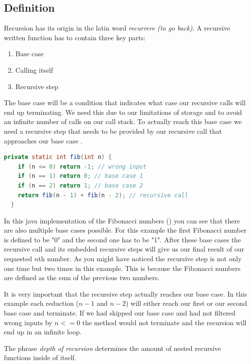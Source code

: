 \documentclass[a4paper, 11pt]{article}
\begin{document}
\subsection{Definition}
Recursion has its origin in the latin word \textit{recurrere (to go back)}. A recursive written function has to contain three key parts:

\begin{enumerate}
  \item Base case
  \item Calling itself
  \item Recursive step
\end{enumerate}

The base case will be a condition that indicates what case our recursive calls will end up terminating.
We need this due to our limitations of storage and to avoid an infinite number of calls on our call stack.
To actually reach this base case we need a recursive step that needs to be provided by our recursive call that approaches our base case \cite{geeksforgeeks}.

\begin{lstlisting}[title={Fibonacci numbers}, language=Java, label={lst:fibonacci}]
  private static int fib(int n) {
    if (n <= 0) return -1; // wrong input
    if (n == 1) return 0; // base case 1
    if (n == 2) return 1; // base case 2
    return fib(n - 1) + fib(n - 2); // recursive call
  }
\end{lstlisting}

In this java implementation of the Fibonacci numbers () you can see that there are also multiple base cases possible.
For this example the first Fibonacci number is defined to be "0" and the second one has to be "1". After these base cases the recursive call and its embedded recursive steps will give us our final result of our requested $n$th number.
As you might have noticed the recursive step is not only one time but two times in this example. This is because the Fibonacci numbers are defined as the sum of the previous two numbers.

It is very important that the recursive step actually reaches our base case. In this example each reduction (\(n-1\) and \(n-2\)) will either reach our first or our second base case and terminate.
If we had skipped our base case and had not filtered wrong inputs by \(n<=0\) the method would not terminate and the recursion will end up in an infinite loop.

The phrase \textit{depth of recursion} determines the amount of nested recursive functions inside of itself.
\end{document}
